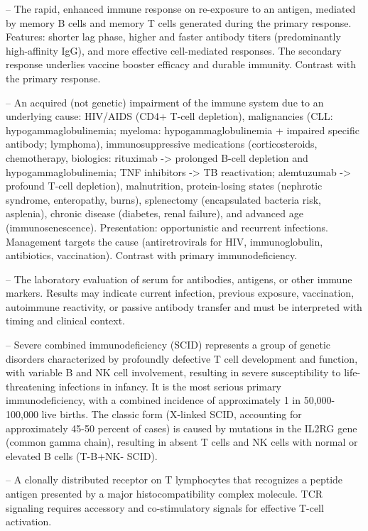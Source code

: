-- The rapid, enhanced immune response on re-exposure to an antigen, mediated by memory B cells and memory T cells generated during the primary response. Features: shorter lag phase, higher and faster antibody titers (predominantly high-affinity IgG), and more effective cell-mediated responses. The secondary response underlies vaccine booster efficacy and durable immunity. Contrast with the primary response.

-- An acquired (not genetic) impairment of the immune system due to an underlying cause: HIV/AIDS (CD4+ T-cell depletion), malignancies (CLL: hypogammaglobulinemia; myeloma: hypogammaglobulinemia + impaired specific antibody; lymphoma), immunosuppressive medications (corticosteroids, chemotherapy, biologics: rituximab -> prolonged B-cell depletion and hypogammaglobulinemia; TNF inhibitors -> TB reactivation; alemtuzumab -> profound T-cell depletion), malnutrition, protein-losing states (nephrotic syndrome, enteropathy, burns), splenectomy (encapsulated bacteria risk, asplenia), chronic disease (diabetes, renal failure), and advanced age (immunosenescence). Presentation: opportunistic and recurrent infections. Management targets the cause (antiretrovirals for HIV, immunoglobulin, antibiotics, vaccination). Contrast with primary immunodeficiency.

-- The laboratory evaluation of serum for antibodies, antigens, or other immune markers. Results may indicate current infection, previous exposure, vaccination, autoimmune reactivity, or passive antibody transfer and must be interpreted with timing and clinical context.

-- Severe combined immunodeficiency (SCID) represents a group of genetic disorders characterized by profoundly defective T cell development and function, with variable B and NK cell involvement, resulting in severe susceptibility to life-threatening infections in infancy. It is the most serious primary immunodeficiency, with a combined incidence of approximately 1 in 50,000-100,000 live births. The classic form (X-linked SCID, accounting for approximately 45-50 percent of cases) is caused by mutations in the IL2RG gene (common gamma chain), resulting in absent T cells and NK cells with normal or elevated B cells (T-B+NK- SCID).

-- A clonally distributed receptor on T lymphocytes that recognizes a peptide antigen presented by a major histocompatibility complex molecule. TCR signaling requires accessory and co-stimulatory signals for effective T-cell activation.

